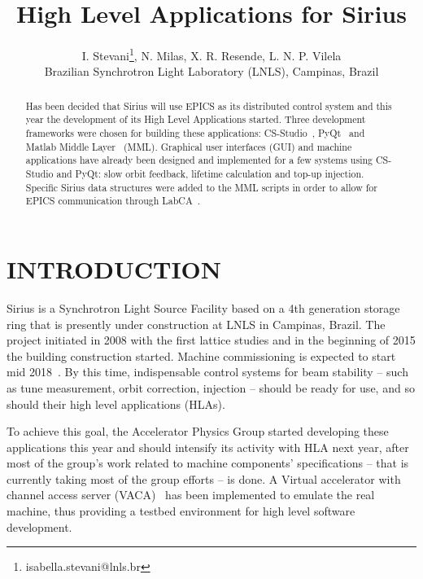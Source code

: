 \documentclass[a4paper,
              ]{jacow}
\begin{document}
\title{High Level Applications for Sirius}

\author{I. Stevani\thanks{isabella.stevani@lnls.br}, N. Milas, X. R. Resende, L. N. P. Vilela\\ Brazilian Synchrotron Light Laboratory (LNLS), Campinas, Brazil}

\maketitle

%
\begin{abstract}
   Has been decided that Sirius will use EPICS as its distributed control system and this year the development of its High Level Applications started. Three development frameworks were chosen for building these applications: CS-Studio~\cite{css}, PyQt~\cite{pyqt} and Matlab Middle Layer~\cite{mml} (MML). Graphical user interfaces (GUI) and machine applications have already been designed and implemented for a few systems using CS-Studio and PyQt: slow orbit feedback, lifetime calculation and top-up injection. Specific Sirius data structures were added to the MML scripts in order to allow for EPICS communication through LabCA~\cite{labca}.
\end{abstract}


\section{INTRODUCTION}
Sirius is a Synchrotron Light Source Facility based on a 4th generation storage ring that is presently under construction at LNLS in Campinas, Brazil. The project initiated in 2008 with the first lattice studies and in the beginning of 2015 the building construction started. Machine commissioning is expected to start mid 2018~\cite{sirius_status}. By this time, indispensable control systems for beam stability -- such as tune measurement, orbit correction, injection -- should be ready for use, and so should their high level applications (HLAs).

To achieve this goal, the Accelerator Physics Group started developing these applications this year and should intensify its activity with HLA next year, after most of the group's work related to machine components' specifications -- that is currently taking most of the group efforts -- is done. A Virtual accelerator with channel access server (VACA)~\cite{vaca} has been implemented to emulate the real machine, thus providing a testbed environment for high level software development.
\end{document}
